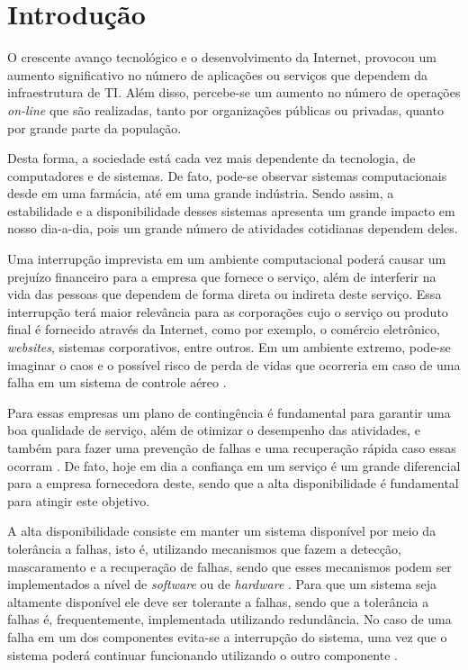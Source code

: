\chapter{Introdução}
O crescente avanço tecnológico e o desenvolvimento da Internet, provocou um aumento significativo no número de aplicações ou serviços que 
dependem da infraestrutura de \ac{TI}. Além disso, percebe-se um aumento no número de operações \textit{on-line} que são realizadas, 
tanto por organizações públicas ou privadas, quanto por grande parte da população.

Desta forma, a sociedade está cada vez mais dependente da tecnologia, de computadores e de sistemas. De fato, pode-se observar 
sistemas computacionais desde em uma farmácia, até em uma grande indústria. Sendo assim, a estabilidade e a disponibilidade desses 
sistemas apresenta um grande impacto em nosso dia-a-dia, pois um grande número de atividades cotidianas dependem deles.

Uma interrupção imprevista em um ambiente computacional poderá causar um prejuízo financeiro para a empresa que fornece o serviço, 
além de interferir na vida das pessoas que dependem de forma direta ou indireta deste serviço. 
Essa interrupção terá maior relevância para as corporações cujo o serviço ou produto final é fornecido através da Internet, 
como por exemplo, o comércio eletrônico, \textit{websites}, sistemas corporativos, entre outros. 
Em um ambiente extremo, pode-se imaginar o caos e o possível risco de perda de vidas que ocorreria em caso de uma falha 
em um sistema de controle aéreo \cite{costa2009}.

Para essas empresas um plano de contingência é fundamental para garantir uma boa qualidade de serviço, além de otimizar o desempenho 
das atividades, e também para fazer uma prevenção de falhas e uma recuperação rápida caso essas ocorram \cite{costa2009}.
De fato, hoje em dia a confiança em um serviço é um grande diferencial para a empresa fornecedora deste, 
sendo que a alta disponibilidade é fundamental para atingir este objetivo.

A alta disponibilidade consiste em manter um sistema disponível por meio da tolerância a falhas, isto é, utilizando mecanismos que fazem a 
detecção, mascaramento e a recuperação de falhas, sendo que esses mecanismos podem ser implementados a nível de \textit{software} ou de 
\textit{hardware} \cite{reis2009}. Para que um sistema seja altamente disponível ele deve ser tolerante a falhas, sendo que a tolerância
a falhas é, frequentemente, implementada utilizando redundância. No caso de uma falha em um dos componentes evita-se a interrupção do sistema,
uma vez que o sistema poderá continuar funcionando utilizando o outro componente \cite{batista2007}.

